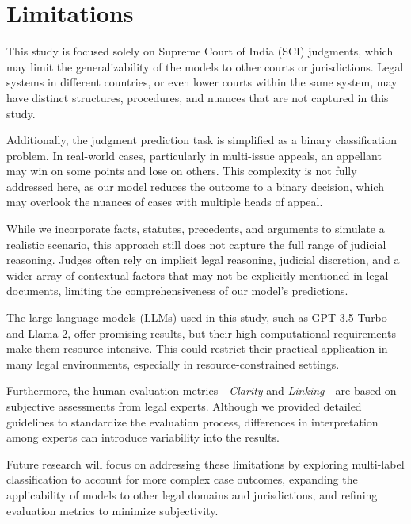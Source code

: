 \section*{Limitations}

This study is focused solely on Supreme Court of India (SCI) judgments, which may limit the generalizability of the models to other courts or jurisdictions. Legal systems in different countries, or even lower courts within the same system, may have distinct structures, procedures, and nuances that are not captured in this study.

Additionally, the judgment prediction task is simplified as a binary classification problem. In real-world cases, particularly in multi-issue appeals, an appellant may win on some points and lose on others. This complexity is not fully addressed here, as our model reduces the outcome to a binary decision, which may overlook the nuances of cases with multiple heads of appeal.

While we incorporate facts, statutes, precedents, and arguments to simulate a realistic scenario, this approach still does not capture the full range of judicial reasoning. Judges often rely on implicit legal reasoning, judicial discretion, and a wider array of contextual factors that may not be explicitly mentioned in legal documents, limiting the comprehensiveness of our model’s predictions.

The large language models (LLMs) used in this study, such as GPT-3.5 Turbo and Llama-2, offer promising results, but their high computational requirements make them resource-intensive. This could restrict their practical application in many legal environments, especially in resource-constrained settings.

Furthermore, the human evaluation metrics—\textit{Clarity} and \textit{Linking}—are based on subjective assessments from legal experts. Although we provided detailed guidelines to standardize the evaluation process, differences in interpretation among experts can introduce variability into the results.

Future research will focus on addressing these limitations by exploring multi-label classification to account for more complex case outcomes, expanding the applicability of models to other legal domains and jurisdictions, and refining evaluation metrics to minimize subjectivity.
